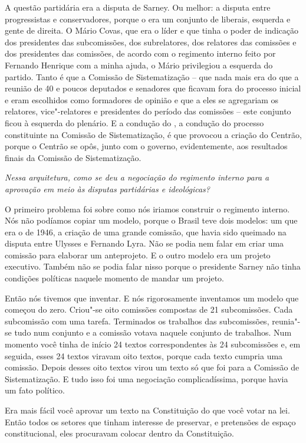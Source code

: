 A questão partidária era a disputa de Sarney. Ou melhor:
a disputa entre progressistas e conservadores, porque o  era um
conjunto de liberais, esquerda e gente de direita. O Mário Covas, que
era o líder e que tinha o poder de indicação dos presidentes das
subcomissões, dos subrelatores, dos relatores das comissões e dos
presidentes das comissões, de acordo com o regimento interno feito por
Fernando Henrique com a minha ajuda, o Mário privilegiou a esquerda do
partido. Tanto é que a Comissão de Sistematização -- que nada mais era
do que a reunião de 40 e poucos deputados e senadores que ficavam fora
do processo inicial e eram escolhidos como formadores de opinião e que a
eles se agregariam os relatores, vice"-relatores e presidentes do período
das comissões -- este conjunto ficou à esquerda do plenário. E a
condução do , a condução do processo constituinte na Comissão de
Sistematização, é que provocou a criação do Centrão, porque o Centrão se
opôs, junto com o governo, evidentemente, aos resultados finais da
Comissão de Sistematização.

\medskip

\noindent\emph{Nessa arquitetura, como se deu a negociação do regimento interno
para a aprovação em meio às disputas partidárias e ideológicas?}

O primeiro problema foi sobre como nós iriamos construir
o regimento interno. Nós não podíamos copiar um modelo, porque o Brasil
teve dois modelos: um que era o de 1946, a criação de uma grande
comissão, que havia sido queimado na disputa entre Ulysses e Fernando
Lyra. Não se podia nem falar em criar uma comissão para elaborar um
anteprojeto. E o outro modelo era um projeto executivo. Também não se
podia falar nisso porque o presidente Sarney não tinha condições
políticas naquele momento de mandar um projeto.

Então nós tivemos que inventar. E nós rigorosamente inventamos um modelo
que começou do zero. Criou"-se oito comissões compostas de 21
subcomissões. Cada subcomissão com uma tarefa. Terminados os trabalhos
das subcomissões, reunia"-se tudo num conjunto e a comissão votava
naquele conjunto de trabalhos. Num momento você tinha de início 24
textos correspondentes às 24 subcomissões e, em seguida, esses 24 textos
viravam oito textos, porque cada texto cumpria uma comissão. Depois
desses oito textos virou um texto só que foi para a Comissão de
Sistematização. E tudo isso foi uma negociação complicadíssima, porque
havia um fato político.

Era mais fácil você aprovar um texto na Constituição do que você votar
na lei. Então todos os setores que tinham interesse de preservar, e
pretensões de espaço constitucional, eles procuravam colocar dentro da
Constituição.

